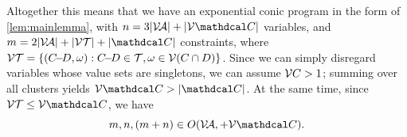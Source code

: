 \documentclass{article}
\begin{document}
\begin{lproof}
    Altogether this means that we have an exponential conic program in the form
    of \cref{lem:mainlemma}, with
        $n = 3|\V\!\Ar| + |\V\C|$ variables,
        and
        $m = 2 |\V\!\Ar| + |\V \mathcal T| +  |\C|$ constraints,
    where
    $\mathcal V\mathcal T = \{ (C\!{-}\!D, \omega) :  C\!{-}\!D \in \mathcal T, \omega \in \mathcal V(C\cap D)\}$.
    Since we can simply disregard variables whose value sets are singletons, we can assume $\mathcal V C > 1$; summing over all clusters yields $\V\C > |\C|$. 
    At the same time, since $\V\mathcal T \le \V\C$, 
    we have 
    \[ m,n,(m + n) \in O(\V\!\Ar, + \V\C).  \]


\end{lproof}
\end{document}
